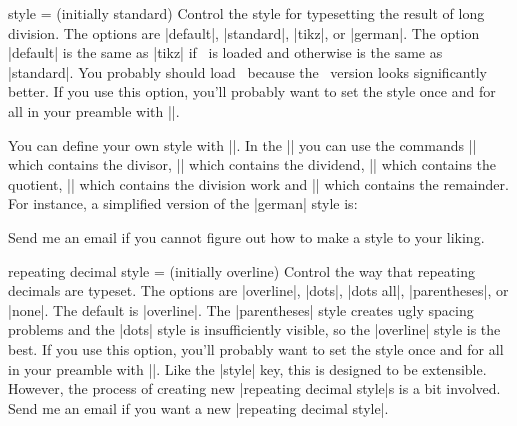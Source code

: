\documentclass{ltxdoc}
\begin{document}
\begin{key}{style =  (initially standard)}
Control the style for typesetting the result of long division. The options are |default|, |standard|, |tikz|, or |german|. The option |default| is the same as |tikz| if \tikzname\ is loaded and otherwise is the same as |standard|. You probably should load \tikzname\ because the \tikzname\ version looks significantly better. If you use this option, you'll probably want to set the style once and for all in your preamble with ||.
\begin{tcblisting}{}
 \quad
{} \quad
{}
\end{tcblisting}
You can define your own style with |\longdivisiondefinestyle|.
In the || you can use the commands |\longdivdivisor| which contains the divisor, |\longdivdividend| which contains the dividend,
|\longdivquotient| which contains the quotient, |\longdivwork| which contains the division work
and |\longdivremainder| which contains the remainder.
For instance, a simplified version of the |german| style is:
\begin{tcblisting}{}
\end{tcblisting}
Send me an email if you cannot figure out how to make a style to your liking.
\end{key}

\begin{key}{repeating decimal style =  (initially overline)}
Control the way that repeating decimals are typeset. The options are |overline|, |dots|, |dots all|, |parentheses|, or |none|. The default is |overline|. The |parentheses| style creates ugly spacing problems and the |dots| style is insufficiently visible, so the |overline| style is the best. If you use this option, you'll probably want to set the style once and for all in your preamble with ||. Like the |style| key, this is designed to be extensible. However, the process of creating new |repeating decimal style|s is a bit involved. Send me an email if you want a new |repeating decimal style|.
\begin{tcblisting}{}
 \quad
{} \quad
{} \quad
{} \quad
{}
\end{tcblisting}
\end{key}
\end{document}
